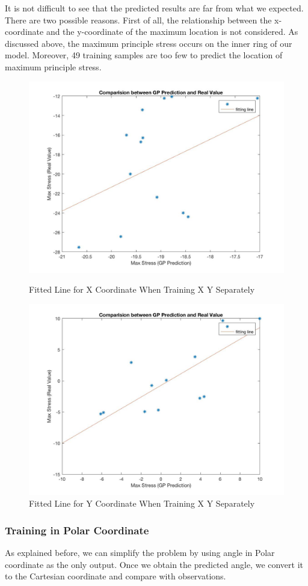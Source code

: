 \documentclass[conference]{IEEEtran}
\begin{document}
It is not difficult to see that the predicted results are far from what we expected. There are two possible reasons. First of all, the relationship between the x-coordinate and the y-coordinate of the maximum location is not considered. As discussed above, the maximum principle stress occurs on the inner ring of our model. Moreover, 49 training samples are too few to predict the location of maximum principle stress. 



\begin{figure} 
\centering
\includegraphics[width=3.4 in,height=2.5 in]{XY_x.jpg}
\caption{Fitted Line for X Coordinate When Training X Y Separately}
\includegraphics[width=3.4 in,height=2.5 in]{XY_y.jpg}
\caption{Fitted Line for Y Coordinate When Training X Y Separately}
\label{fig:graph}
\end{figure}


\subsubsection{Training in Polar Coordinate}
As explained before, we can simplify the problem by using angle in Polar coordinate as the only output. Once we obtain the predicted angle, we convert it to the Cartesian coordinate and compare with observations.
\end{document}

